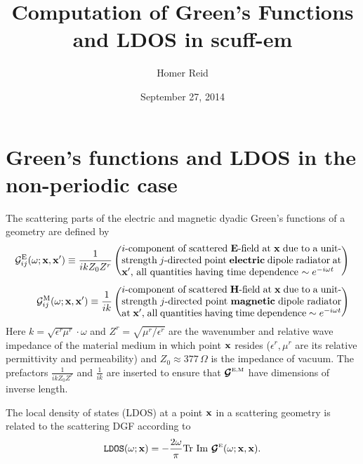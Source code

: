 \documentclass[letterpaper]{article}
\title {Computation of Green's Functions and LDOS in {\sc scuff-em}}
\author {Homer Reid}
\date {September 27, 2014}
\begin{document}
\pagestyle{myheadings}
\maketitle

\tableofcontents

\newpage
\section{Green's functions and LDOS in the non-periodic case}

The scattering parts of the electric and magnetic
dyadic Green's functions of a geometry are defined by
\begin{align*}
 \mc G_{ij}\sups{E}(\omega; \vb x, \vb x^\prime)
   \equiv
   \frac{1}{ikZ_0 Z^r}
  &\left( \parbox{0.65\textwidth}
    { $i$-component of scattered $\vb E$-field at $\vb x$
      due to a unit-strength $j$-directed point \textbf{electric} 
      dipole radiator
      at $\vb x^\prime$, all quantities having time dependence
      $\sim e^{-i\omega t}$
    }
   \right)
\\[5pt]
 \mc G_{ij}\sups{M}(\omega; \vb x, \vb x^\prime)
   \equiv
   \frac{1}{ik}
  &\left( \parbox{0.65\textwidth}
    { $i$-component of scattered $\vb H$-field at $\vb x$
      due to a unit-strength $j$-directed point \textbf{magnetic}
      dipole radiator
      at $\vb x^\prime$, all quantities having time dependence
      $\sim e^{-i\omega t}$
    }
   \right)
\end{align*}
Here $k=\sqrt{\epsilon^r \mu^r }\cdot \omega$ and 
$Z^r=\sqrt{\mu^r /\epsilon^r }$ are the wavenumber and 
relative wave impedance of the material medium in which 
point $\mathbf{x}$ resides ($\epsilon^r ,\mu^r$ are its relative 
permittivity and permeability) and $Z_0\approx 377\,\Omega$  
is the impedance of vacuum. The prefactors 
$\frac{1}{ikZ_0Z^r}$ and $\frac{1}{ik}$ are inserted to 
ensure that $\boldsymbol{\mathcal{G}}^{\hbox{\tiny{E,M}}}$ have dimensions of inverse
length.

The local density of states (LDOS) at a point $\mathbf{x}$
in a scattering geometry is related to the scattering
DGF according to
$$ \texttt{LDOS}(\omega; \mathbf{x}) 
   = 
   -\frac{2\omega}{\pi}\text{Tr }\text{Im }\boldsymbol{\mathcal{G}}^{\hbox{\tiny{E}}}(\omega; \mathbf{x}, \mathbf{x}).
$$
\end{document}
